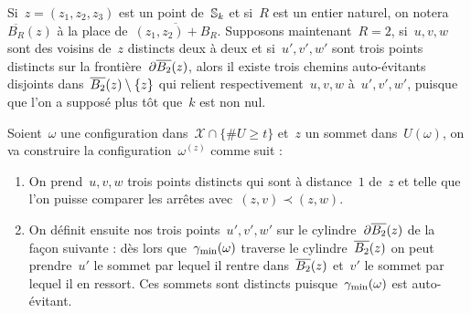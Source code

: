 			\begin{rem}
				Si~$z = (z_1, z_2, z_3)$ est un point de~$\mathbb{S}_k$ et si~$R$ est un entier naturel, on notera~$\overline{B_R}(z)$  à la place de~$\overline{(z_1, z_2) + B_R}$. Supposons maintenant~$R=2$, si~$u, v, w$ sont des voisins de~$z$ distincts deux à deux et si~$u', v', w'$ sont trois points distincts sur la frontière~$\partial \overline{B_{2}}(z)$, alors il existe trois chemins auto-évitants disjoints dans~$\overline{B_{2}}(z)\setminus\{z\}$ qui relient respectivement~$u, v, w$ à~$u', v', w'$, puisque que l'on a supposé plus tôt que~$k$ est non nul. 
			\end{rem}
			\begin{dem}
				Soient~$\omega$ une configuration dans~$\mathcal{X}\cap\{\# U \geq t\}$ et~$z$ un sommet dans~$U(\omega)$, on va construire la configuration~$\omega^{(z)}$  comme suit :
				\begin{enumerate}
					\item\label{item:cons:a} On prend~$u,v,w$  trois points distincts qui sont  à distance~$1$ de~$z$  et telle que l'on puisse comparer les arrêtes avec~$(z,v)\prec (z,w)$.
					
					\item\label{item:cons:b} On définit ensuite nos trois points~$u',v',w'$ sur le cylindre~$\partial\overline{B_{2}}(z)$ de la façon suivante : dès lors que~$\gamma_{\mathrm{min}}(\omega)$ traverse le cylindre~$\overline{B_{2}}(z)$ on peut prendre~$u'$  le sommet par lequel il rentre dans~$\overline{B_{2}}(z)$ et~$v'$  le sommet par lequel il en ressort. Ces sommets sont distincts puisque~$\gamma_{\mathrm{min}}(\omega)$ est auto-évitant. 
					

\end{enumerate}
\end{dem}

